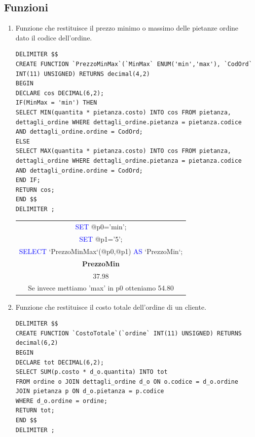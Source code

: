 \documentclass[10pt]{article}
\begin{document}
		\subsection{Funzioni}
		\begin{enumerate}[noitemsep]
		\item Funzione che restituisce il prezzo minimo o massimo delle pietanze ordine dato il codice dell'ordine.
		\begin{lstlisting}[style=Mysql]
DELIMITER $$
CREATE FUNCTION `PrezzoMinMax`(`MinMax` ENUM('min','max'), `CodOrd` INT(11) UNSIGNED) RETURNS decimal(4,2)
BEGIN
DECLARE cos DECIMAL(6,2);
IF(MinMax = 'min') THEN
SELECT MIN(quantita * pietanza.costo) INTO cos FROM pietanza, dettagli_ordine WHERE dettagli_ordine.pietanza = pietanza.codice AND dettagli_ordine.ordine = CodOrd; 
ELSE
SELECT MAX(quantita * pietanza.costo) INTO cos FROM pietanza, dettagli_ordine WHERE dettagli_ordine.pietanza = pietanza.codice AND dettagli_ordine.ordine = CodOrd;
END IF;
RETURN cos;
END $$
DELIMITER ;
\end{lstlisting}
\begin{center}
	\begin{table}[H]
		\centering
		\label{table:fun1}
		\begin{tabular}{|c|}
			\hline
			\textcolor{blue}{SET} \textcolor{amber}{@}p0='min'; \\
			\textcolor{blue}{SET} \textcolor{amber}{@}p1='5'; \\
			\textcolor{blue}{SELECT} `PrezzoMinMax`(\textcolor{amber}{@}p0,\textcolor{amber}{@}p1) \textcolor{blue}{AS} `PrezzoMin`;
			\\ \hline
			\textbf{PrezzoMin} \\ \hline
			37.98 \\ \hline
			Se invece mettiamo 'max' in p0 otteniamo 54.80 \\ \hline
		\end{tabular}
	\end{table}
\end{center}
		\item Funzione che restituisce il costo totale dell'ordine di un cliente.
\begin{lstlisting}[style=Mysql]
DELIMITER $$
CREATE FUNCTION `CostoTotale`(`ordine` INT(11) UNSIGNED) RETURNS decimal(6,2)
BEGIN
DECLARE tot DECIMAL(6,2);
SELECT SUM(p.costo * d_o.quantita) INTO tot
FROM ordine o JOIN dettagli_ordine d_o ON o.codice = d_o.ordine JOIN pietanza p ON d_o.pietanza = p.codice
WHERE d_o.ordine = ordine;
RETURN tot;
END $$
DELIMITER ;
\end{lstlisting}

\end{enumerate}
\end{document}
